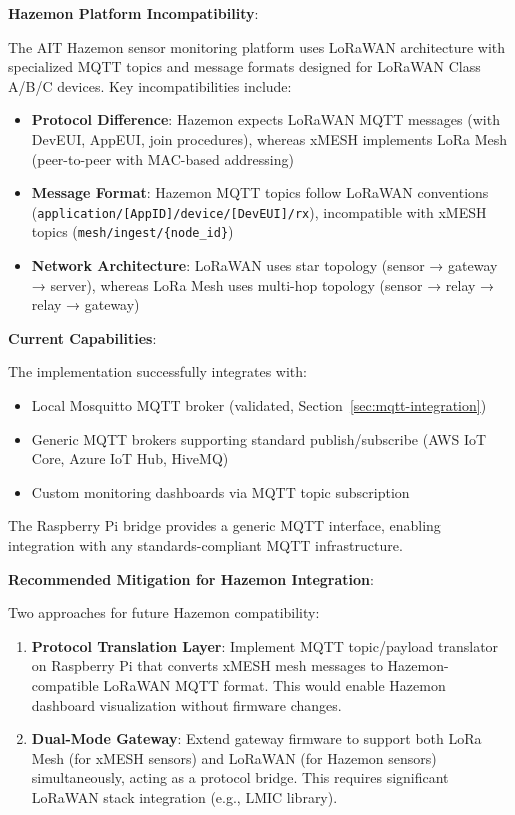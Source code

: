 \textbf{Hazemon Platform Incompatibility}:

The AIT Hazemon sensor monitoring platform uses LoRaWAN architecture with specialized MQTT topics and message formats designed for LoRaWAN Class A/B/C devices. Key incompatibilities include:

\begin{itemize}
\item \textbf{Protocol Difference}: Hazemon expects LoRaWAN MQTT messages (with DevEUI, AppEUI, join procedures), whereas xMESH implements LoRa Mesh (peer-to-peer with MAC-based addressing)
\item \textbf{Message Format}: Hazemon MQTT topics follow LoRaWAN conventions (\texttt{application/[AppID]/device/[DevEUI]/rx}), incompatible with xMESH topics (\texttt{mesh/ingest/\{node\_id\}})
\item \textbf{Network Architecture}: LoRaWAN uses star topology (sensor → gateway → server), whereas LoRa Mesh uses multi-hop topology (sensor → relay → relay → gateway)
\end{itemize}

\textbf{Current Capabilities}:

The implementation successfully integrates with:
\begin{itemize}
\item Local Mosquitto MQTT broker (validated, Section~\ref{sec:mqtt-integration})
\item Generic MQTT brokers supporting standard publish/subscribe (AWS IoT Core, Azure IoT Hub, HiveMQ)
\item Custom monitoring dashboards via MQTT topic subscription
\end{itemize}

The Raspberry Pi bridge provides a generic MQTT interface, enabling integration with any standards-compliant MQTT infrastructure.

\textbf{Recommended Mitigation for Hazemon Integration}:

Two approaches for future Hazemon compatibility:

\begin{enumerate}
\item \textbf{Protocol Translation Layer}: Implement MQTT topic/payload translator on Raspberry Pi that converts xMESH mesh messages to Hazemon-compatible LoRaWAN MQTT format. This would enable Hazemon dashboard visualization without firmware changes.

\item \textbf{Dual-Mode Gateway}: Extend gateway firmware to support both LoRa Mesh (for xMESH sensors) and LoRaWAN (for Hazemon sensors) simultaneously, acting as a protocol bridge. This requires significant LoRaWAN stack integration (e.g., LMIC library).
\end{enumerate}

